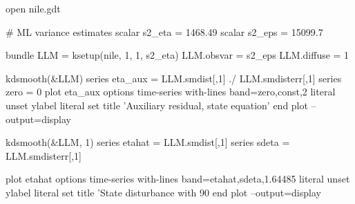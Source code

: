 \begin{script}[htbp]
  \label{script:auxres}
\begin{scode}
open nile.gdt

# ML variance estimates
scalar s2_eta = 1468.49
scalar s2_eps = 15099.7

bundle LLM = ksetup(nile, 1, 1, s2_eta)
LLM.obsvar = s2_eps
LLM.diffuse = 1

kdsmooth(&LLM)
series eta_aux = LLM.smdist[,1] ./ LLM.smdisterr[,1]
series zero = 0
plot eta_aux
    options time-series with-lines band=zero,const,2
    literal unset ylabel
    literal set title 'Auxiliary residual, state equation'
end plot --output=display

kdsmooth(&LLM, 1)
series etahat = LLM.smdist[,1]
series sdeta = LLM.smdisterr[,1]

plot etahat
    options time-series with-lines band=etahat,sdeta,1.64485
    literal unset ylabel
    literal set title 'State disturbance with 90%
end plot --output=display
\end{scode}
\end{script}

